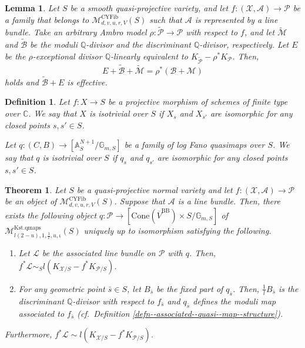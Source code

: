 \documentclass[10pt,a4paper]{amsart}
\newtheorem{lem}{Lemma}
\newtheorem{defn}{Definition}
\newtheorem{thm}{Theorem}
\begin{document}
\begin{lem}\label{lemma--description--of--base--locus}
     Let $S$ be a smooth quasi-projective variety, and let $f\colon (\mathcal{X},\mathcal{A})\to\mathcal{P}$ be a family that belongs to $\mathcal{M}_{d,v,u,r,V}^{\mathrm{CYFib}}(S)$ such that $\mathcal{A}$ is represented by a line bundle.
    Take an arbitrary Ambro model $\rho\colon\tilde{\mathcal{P}}\to \mathcal{P}$ with respect to $f$, and let $\widetilde{\mathcal{M}}$ and $\widetilde{\mathcal{B}}$ be the moduli $\mathbb{Q}$-divisor and the discriminant $\mathbb{Q}$-divisor, respectively.
    Let $E$ be the $\rho$-exceptional divisor $\mathbb{Q}$-linearly equivalent to $K_{\widetilde{\mathcal{P}}}-\rho^*K_{\mathcal{P}}$. 
    Then, 
    \[
E+\widetilde{\mathcal{B}}+\widetilde{\mathcal{M}}=\rho^*(\mathcal{B}+\mathcal{M})
\]
    holds and $\widetilde{\mathcal{B}}+E$ is effective. 
\end{lem}

\begin{defn}\label{defn--isotrivial}
    Let $f\colon X\to S$ be a projective morphism of schemes of finite type over $\mathbb{C}$.
    We say that $X$ is {\it isotrivial} over $S$ if $X_s$ and $X_{s'}$ are isomorphic for any closed points $s,s'\in S$.

    Let $q\colon (C,B)\to [\mathbb{A}^{N+1}_S/\mathbb{G}_{m,S}]$ be a family of log Fano quasimaps over $S$.
    We say that $q$ is {\it isotrivial} over $S$ if $q_s$ and $q_{s'}$ are isomorphic for any closed points $s,s'\in S$.
\end{defn}

\begin{thm}\label{thm--quasi--map--const}
        Let $S$ be a quasi-projective normal variety and let $f\colon(\mathcal{X},\mathcal{A})\to\mathcal{P}$ be an object of $\mathcal{M}_{d,v,u,r,V}^{\mathrm{CYFib}}(S)$.
        Suppose that $\mathcal{A}$ is a line bundle.
Then, there exists the following object $q\colon \mathcal{P}\to [\mathrm{Cone}(\overline{V}^{\mathrm{BB}})\times S/\mathbb{G}_{m,S}]$ of $\mathcal{M}_{l(2-u),1,\frac{1}{l},u,\iota}^{\mathrm{Kst.qmaps}}(S)$ uniquely up to isomorphism satisfying the following. 
\begin{enumerate}
\item Let $\mathscr{L}$ be the associated line bundle on $\mathcal{P}$ with $q$. Then, $f^*\mathscr{L}\sim_S l(K_{\mathcal{X}/S}-f^*K_{\mathcal{P}/S})$.
\item For any geometric point $\bar{s}\in S$, let $B_{\bar{s}}$ be the fixed part of $q_{\bar{s}}$.
Then, $\frac{1}{l}B_{\bar{s}}$ is the discriminant $\mathbb{Q}$-divisor with respect to $f_{\bar{s}}$ and $q_{\bar{s}}$ defines the moduli map associated to $f_{\bar{s}}$ (cf.~Definition \ref{defn--associated--quasi--map--structure}).
\end{enumerate}
Furthermore, $f^*\mathscr{L}\sim l(K_{\mathcal{X}/S}-f^*K_{\mathcal{P}/S})$.
    \end{thm}
\end{document}
